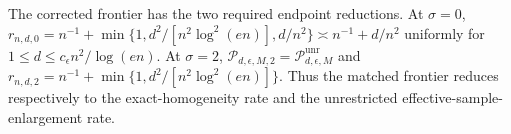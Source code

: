 The corrected frontier has the two required endpoint reductions. At \(\sigma=0\), \(r_{n,d,0}=n^{-1}+\min\{1,d^2/[n^2\log^2(en)],d/n^2\}\asymp n^{-1}+d/n^2\) uniformly for \(1\le d\le c_{\epsilon}n^2/\log(en)\). At \(\sigma=2\), \(\mathcal P_{d,\epsilon,M,2}=\mathcal P_{d,\epsilon,M}^{\mathrm{unr}}\) and \(r_{n,d,2}=n^{-1}+\min\{1,d^2/[n^2\log^2(en)]\}\). Thus the matched frontier reduces respectively to the exact-homogeneity rate and the unrestricted effective-sample-enlargement rate.